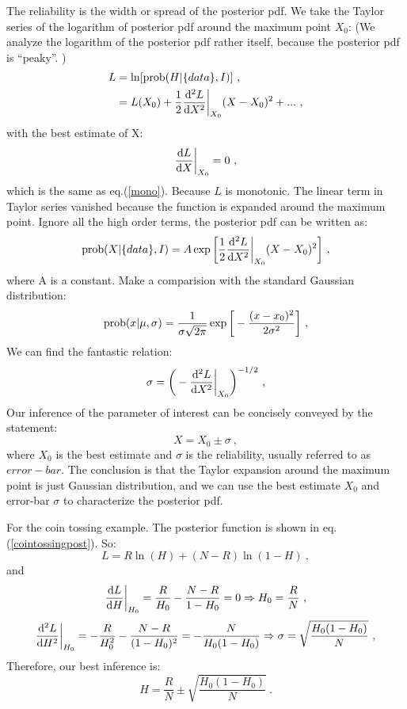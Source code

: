 \documentclass[11pt, a4paper]{article}
\begin{document}
The reliability is the width or spread of the posterior pdf. We take the Taylor series of the logarithm of posterior pdf around the maximum point $X_0$: (We analyze the logarithm of the posterior pdf rather itself, because the posterior pdf is ``peaky''. )
\begin{align}
L &= \ln[{\rm prob}(H|\{data\},I)]~,\\
   &= L(X_0)+\frac{1}{2}\frac{{\rm d}^2 L}{{\rm d} X^2} \bigg |_{X_0}(X-X_0)^2+ ...~,
\end{align}
with the best estimate of X:
\begin{equation}
\frac{{\rm d}L}{{\rm d}X}\bigg |_{X_0}=0~,
\end{equation}
which is the same as eq.(\ref{mono}). Because $L$ is monotonic. The linear term in Taylor series vanished because the function is expanded around the maximum point. Ignore all the high order terms, the posterior pdf can be written as:
\begin{equation}
{\rm prob}(X|\{data\},I)=A\exp\bigg[{\frac{1}{2}\frac{{\rm d}^2L}{{\rm d}X^2}\bigg|_{X_0}(X-X_0)^2}\bigg]~,
\end{equation}
where A is a constant. Make a comparision with the standard Gaussian distribution:
\begin{equation}
{\rm prob}(x|\mu,\sigma)=\frac{1}{\sigma \sqrt{2\pi}}\exp\bigg[-\frac{(x-x_0)^2}{2\sigma^2}\bigg]~,
\end{equation}
We can find the fantastic relation:
\begin{equation}\label{uncertainty}
\sigma=\bigg(-\frac{{\rm d}^2L}{{\rm d}X^2}\bigg|_{X_0}\bigg)^{-1/2}~,
\end{equation}
Our inference of the parameter of interest can be concisely conveyed by the statement:
\begin{equation}
X=X_0\pm\sigma~,
\end{equation}
where $X_0$ is the best estimate and $\sigma$ is the reliability, usually referred to as $error-bar$. The conclusion is that the Taylor expansion around the maximum point is just Gaussian distribution, and we can use the best estimate $X_0$ and error-bar $\sigma$ to characterize the posterior pdf.

For the coin tossing example. The posterior function is shown in eq.(\ref{cointossingpost}). So:
\begin{equation}
L=R\ln(H)+(N-R)\ln(1-H)~,
\end{equation}
and
\begin{equation}
\frac{{\rm d}L}{{\rm d}H}\bigg|_{H_0}=\frac{R}{H_0}-\frac{N-R}{1-H_0}=0\Rightarrow H_0=\frac{R}{N}~,
\end{equation}
\begin{equation}
\frac{{\rm d}^2L}{{\rm d}H^2}\bigg |_{H_0}=-\frac{R}{H_0^2}-\frac{N-R}{(1-H_0)^2}=-\frac{N}{H_0(1-H_0)}\Rightarrow\sigma=\sqrt{\frac{H_0(1-H_0)}{N}}~,
\end{equation}
Therefore, our best inference is:
\begin{equation}
H=\frac{R}{N}\pm\sqrt{\frac{H_0(1-H_0)}{N}}~.
\end{equation}
\end{document}
